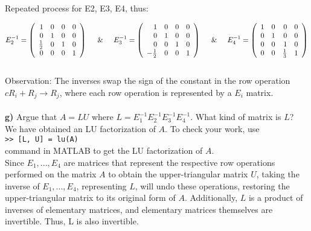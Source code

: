 \documentclass{article}
\begin{document}
Repeated process for E2, E3, E4, thus:

\[
E_2^{-1} = 
\left(
\begin{array}{rrrr}
1 & 0 & 0 & 0 \\
0 & 1 & 0 & 0 \\
\frac{1}{2} & 0 & 1 & 0 \\
0 & 0 & 0 & 1 
\end{array}
\right)
\hspace{0.5cm} \& \hspace{0.5cm}
E_3^{-1} = 
\left(
\begin{array}{rrrr}
1 & 0 & 0 & 0 \\
0 & 1 & 0 & 0 \\
0 & 0 & 1 & 0 \\
-\frac{1}{2} & 0 & 0 & 1 
\end{array}
\right)
\hspace{0.5cm} \& \hspace{0.5cm}
E_4^{-1} = 
\left(
\begin{array}{rrrr}
1 & 0 & 0 & 0 \\
0 & 1 & 0 & 0 \\
0 & 0 & 1 & 0 \\
0 & 0 & \frac{1}{3} & 1 
\end{array}
\right)
\]\\

Observation: The inverses swap the sign of the constant in the row operation $cR_i + R_j \rightarrow R_j$, where each row operation is represented by a $E_i$ matrix.\\\\

{\bf g)} Argue that $A = LU$ where $L= E_1^{-1}E_2^{-1} E_3^{-1}E_4^{-1}$. What
kind of matrix is $L$? \\
We have obtained
an LU factorization of $A$. To check your work, use \\
{\tt >> [L, U] = lu(A)} \\
command in MATLAB to get the LU factorization of $A$. \\

Since $E_1, ..., E_4$ are matrices that represent the respective row operations performed on the matrix $A$ to obtain the upper-triangular matrix $U$, taking the inverse of $E_1, ..., E_4$, representing $L$, will undo these operations, restoring the upper-triangular matrix to its original form of $A$. Additionally, $L$ is a product of inverses of elementary matrices, and elementary matrices themselves are invertible. Thus, L is also invertible.
\end{document}
